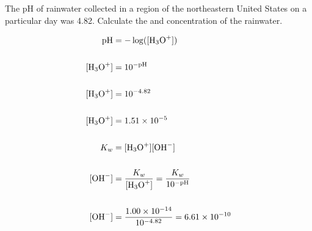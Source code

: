 \documentclass[12pt]{article}
\begin{document}
The pH of rainwater collected in a region of the northeastern United States on a particular day was 4.82. Calculate the  and  concentration of the rainwater.

\begin{align*}
        \text{pH} &= -\log([\ce{H3O+}]) \\
    \\
    [\ce{H3O+}] &= 10^{-\text{pH}} \\
    \\
    [\ce{H3O+}] &= 10^{-4.82} \\
    \\ 
    [\ce{H3O+}] &= 1.51 \times 10^{-5} \\
    \\
    K_{w} &= [\ce{H3O+}][\ce{OH-}] \\ 
    \\
    [\ce{OH-}] &= \frac{K_{w}}{[\ce{H3O+}]} = \frac{K_{w}}{10^{-\text{pH}}} \\
    \\
    [\ce{OH-}] &= \frac{1.00\times10^{-14}}{10^{-4.82}} = 6.61 \times 10^{-10} \\
\end{align*}

\newpage
\end{document}
